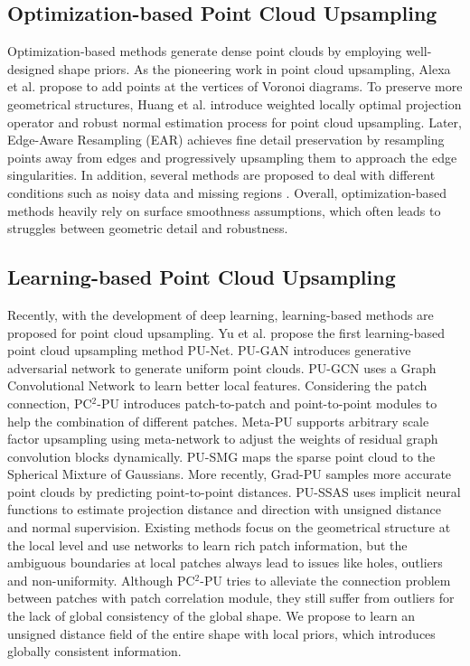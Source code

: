 \documentclass[letterpaper]{article} %
\begin{document}
\subsection{Optimization-based Point Cloud Upsampling}
Optimization-based methods generate dense point clouds by employing well-designed shape priors. As the pioneering work in point cloud upsampling, Alexa et al. \citeyear{alexa2003computing} propose to add points at the vertices of Voronoi diagrams. To preserve more geometrical structures, Huang et al. \citeyear{huang2009consolidation} introduce weighted locally optimal projection operator and robust normal estimation process for point cloud upsampling. Later, Edge-Aware Resampling (EAR) \cite{huang2013edge} achieves fine detail preservation by resampling points away from edges and progressively upsampling them to approach the edge singularities. In addition, several methods are proposed to deal with different conditions such as noisy data \cite{lipman2007parameterization} and missing regions \cite{wu2015deep}. 
Overall, optimization-based methods heavily rely on surface smoothness assumptions, which often leads to struggles between geometric detail and robustness.
\subsection{Learning-based Point Cloud Upsampling}

Recently, with the development of deep learning, learning-based methods \cite{yu2018pu, qian2020pugeo, luo2021pu, liu2022spu, feng2022neural} are proposed for point cloud upsampling. Yu et al. \cite{yu2018pu} propose the first learning-based point cloud upsampling method PU-Net. PU-GAN \cite{li2019pu} introduces generative adversarial network \cite{goodfellow2014generative} to generate uniform point clouds. PU-GCN \cite{qian2021pu} uses a Graph Convolutional Network to learn better local features. Considering the patch connection, PC${^2}$-PU \cite{long2022pc2} introduces patch-to-patch and point-to-point modules to help the combination of different patches. Meta-PU \cite{ye2021meta} supports arbitrary scale factor upsampling using meta-network to adjust the weights of residual graph convolution blocks dynamically. PU-SMG \cite{dell2022arbitrary} maps the sparse point cloud to the Spherical Mixture of Gaussians. More recently, Grad-PU \cite{he2023grad} samples more accurate point clouds by predicting point-to-point distances. PU-SSAS \cite{zhao2023self} uses implicit neural functions to estimate projection distance and direction with unsigned distance and normal supervision. Existing methods focus on the geometrical structure at the local level and use networks to learn rich patch information, but the ambiguous boundaries at local patches always lead to issues like holes, outliers and non-uniformity. Although PC${^2}$-PU tries to alleviate the connection problem between patches with patch correlation module, they still suffer from outliers for the lack of global consistency of the global shape. We propose to learn an unsigned distance field of the entire shape with local priors, which introduces globally consistent information.
\end{document}
